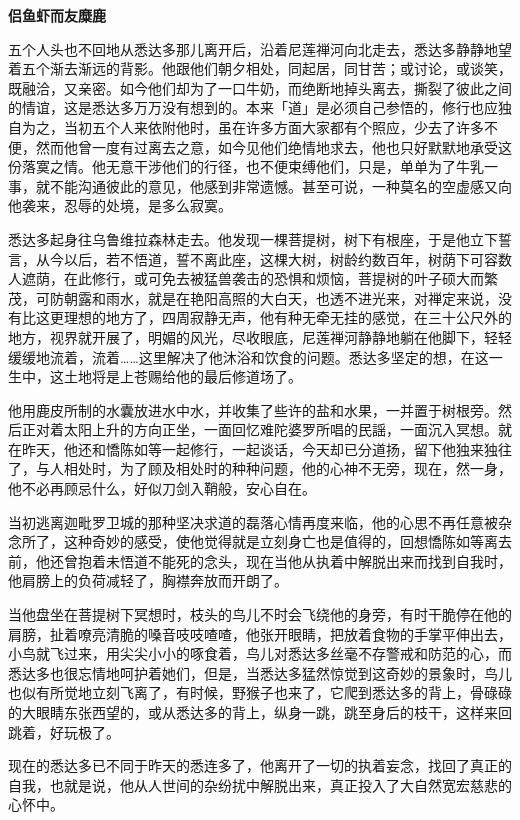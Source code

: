\documentclass[twoside,openany]{book}
\newcommand{\mt}[1]{\textbullet \textbf{#1}}
\begin{document}
\mt{侣鱼虾而友糜鹿}

五个人头也不回地从悉达多那儿离开后，沿着尼莲禅河向北走去，悉达多静静地望着五个渐去渐远的背影。他跟他们朝夕相处，同起居，同甘苦；或讨论，或谈笑，既融洽，又亲密。如今他们却为了一口牛奶，而绝断地掉头离去，撕裂了彼此之间的情谊，这是悉达多万万没有想到的。本来「道」是必须自己参悟的，修行也应独自为之，当初五个人来依附他时，虽在许多方面大家都有个照应，少去了许多不便，然而他曾一度有过离去之意，如今见他们绝情地求去，他也只好默默地承受这份落寞之情。他无意干涉他们的行径，也不便束缚他们，只是，单单为了牛乳一事，就不能沟通彼此的意见，他感到非常遗憾。甚至可说，一种莫名的空虚感又向他袭来，忍辱的处境，是多么寂寞。

悉达多起身往乌鲁维拉森林走去。他发现一棵菩提树，树下有根座，于是他立下誓言，从今以后，若不悟道，誓不离此座，这棵大树，树龄约数百年，树荫下可容数人遮荫，在此修行，或可免去被猛兽袭击的恐惧和烦恼，菩提树的叶子硕大而繁茂，可防朝露和雨水，就是在艳阳高照的大白天，也透不进光来，对禅定来说，没有比这更理想的地方了，四周寂静无声，他有种无牵无挂的感觉，在三十公尺外的地方，视界就开展了，明媚的风光，尽收眼底，尼莲禅河静静地躺在他脚下，轻轻缓缓地流着，流着……这里解决了他沐浴和饮食的问题。悉达多坚定的想，在这一生中，这土地将是上苍赐给他的最后修道场了。

他用鹿皮所制的水囊放进水中水，并收集了些许的盐和水果，一并置于树根旁。然后正对着太阳上升的方向正坐，一面回忆难陀婆罗所唱的民謡，一面沉入冥想。就在昨天，他还和憍陈如等一起修行，一起谈话，今天却已分道扬，留下他独来独往了，与人相处时，为了顾及相处时的种种问题，他的心神不无旁，现在，然一身，他不必再顾忌什么，好似刀剑入鞘般，安心自在。

当初逃离迦毗罗卫城的那种坚决求道的磊落心情再度来临，他的心思不再任意被杂念所了，这种奇妙的感受，使他觉得就是立刻身亡也是值得的，回想憍陈如等离去前，他还曾抱着未悟道不能死的念头，现在当他从执着中解脱出来而找到自我时，他肩膀上的负荷减轻了，胸襟奔放而开朗了。

当他盘坐在菩提树下冥想时，枝头的鸟儿不时会飞绕他的身旁，有时干脆停在他的肩膀，扯着嘹亮清脆的嗓音吱吱喳喳，他张开眼睛，把放着食物的手掌平伸出去，小鸟就飞过来，用尖尖小小的啄食着，鸟儿对悉达多丝毫不存警戒和防范的心，而悉达多也很忘情地呵护着她们，但是，当悉达多猛然惊觉到这奇妙的景象时，鸟儿也似有所觉地立刻飞离了，有时候，野猴子也来了，它爬到悉达多的背上，骨碌碌的大眼睛东张西望的，或从悉达多的背上，纵身一跳，跳至身后的枝干，这样来回跳着，好玩极了。

现在的悉达多已不同于昨天的悉连多了，他离开了一切的执着妄念，找回了真正的自我，也就是说，他从人世间的杂纷扰中解脱出来，真正投入了大自然宽宏慈悲的心怀中。
\end{document}
